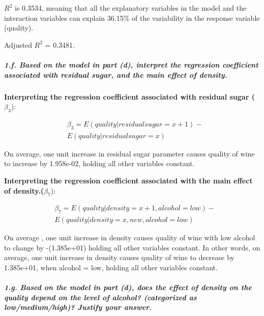 \documentclass[
]{article}
\begin{document}
\(R^2\) is 0.3534, meaning that all the explanatory variables in the
model and the interaction variables can explain 36.15\% of the
variability in the response variable (quality).

Adjusted \(R^2\) = 0.3481.

\hypertarget{f.-based-on-the-model-in-part-d-interpret-the-regression-coefficient-associated-with-residual-sugar-and-the-main-effect-of-density.}{%
\subparagraph{1.f. Based on the model in part (d), interpret the
regression coefficient associated with residual sugar, and the main
effect of
density.}\label{f.-based-on-the-model-in-part-d-interpret-the-regression-coefficient-associated-with-residual-sugar-and-the-main-effect-of-density.}}

\textbf{Interpreting the regression coefficient associated with residual
sugar (}\(\beta_3\)):

\[
\begin{align}
&\beta_3 = E(quality|residual sugar = x + 1) -  \\
&E(quality|residual sugar = x)
\end{align}
\]

On average, one unit increase in residual sugar parameter causes quality
of wine to increase by 1.958e-02, holding all other variables constant.

\textbf{Interpreting the regression coefficient associated with the main
effect of density.(}\(\beta_7\)):

\[
\begin{align}
&\beta_7 = E(quality|density = x + 1, alcohol=low) -  \\
&E(quality|density = x,new,alcohol=low)
\end{align}
\]

On average , one unit increase in density causes quality of wine with
low alcohol to change by -(1.385e+01) holding all other variables
constant. In other words, on average, one unit increase in density
causes quality of wine to decrease by 1.385e+01, when alcohol = low,
holding all other variables constant.

\hypertarget{g.-based-on-the-model-in-part-d-does-the-effect-of-density-on-the-quality-depend-on-the-level-of-alcohol-categorized-as-lowmediumhigh-justify-your-answer.}{%
\subparagraph{1.g. Based on the model in part (d), does the effect of
density on the quality depend on the level of alcohol? (categorized as
low/medium/high)? Justify your
answer.}\label{g.-based-on-the-model-in-part-d-does-the-effect-of-density-on-the-quality-depend-on-the-level-of-alcohol-categorized-as-lowmediumhigh-justify-your-answer.}}
\end{document}
